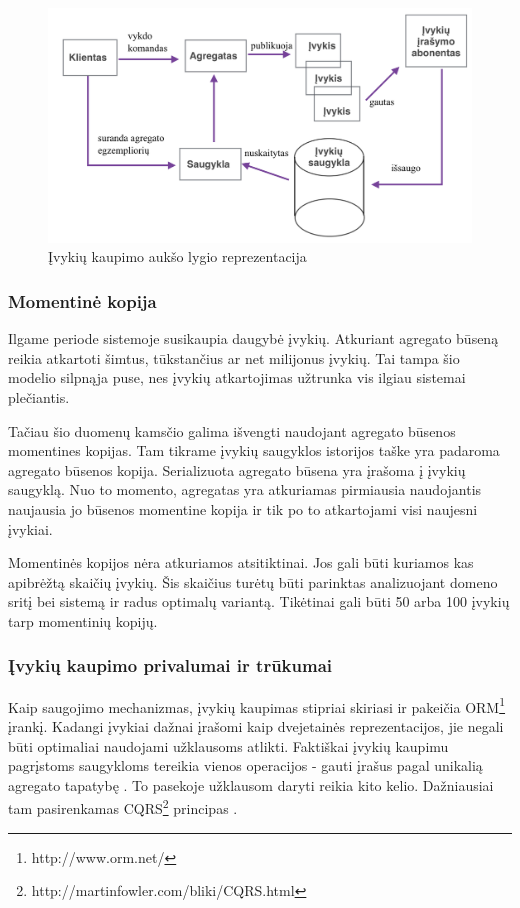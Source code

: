 \begin{figure}[ht]
	\centering
	\includegraphics[width=0.9\linewidth]{pics/es.png}
	\caption{Įvykių kaupimo aukšo lygio reprezentacija}
	\label{pic:es}
\end{figure}

\subsubsection{Momentinė kopija}

Ilgame periode sistemoje susikaupia daugybė įvykių. Atkuriant agregato būseną reikia atkartoti šimtus, tūkstančius ar net milijonus įvykių. Tai tampa šio modelio silpnąja puse, nes įvykių atkartojimas užtrunka vis ilgiau sistemai plečiantis.

Tačiau šio duomenų kamsčio galima išvengti naudojant agregato būsenos momentines kopijas. Tam tikrame įvykių saugyklos istorijos taške yra padaroma agregato būsenos kopija. Serializuota agregato būsena yra įrašoma į įvykių saugyklą. Nuo to momento, agregatas yra atkuriamas pirmiausia naudojantis naujausia jo būsenos momentine kopija ir tik po to atkartojami visi naujesni įvykiai.

Momentinės kopijos nėra atkuriamos atsitiktinai. Jos gali būti kuriamos kas apibrėžtą skaičių įvykių. Šis skaičius turėtų būti parinktas analizuojant domeno sritį bei sistemą ir radus optimalų variantą. Tikėtinai gali būti 50 arba 100 įvykių tarp momentinių kopijų.

\subsubsection{Įvykių kaupimo privalumai ir trūkumai}

Kaip saugojimo mechanizmas, įvykių kaupimas stipriai skiriasi ir pakeičia ORM\footnote{http://www.orm.net/} įrankį. Kadangi įvykiai dažnai įrašomi kaip dvejetainės reprezentacijos, jie negali būti optimaliai naudojami užklausoms atlikti. Faktiškai įvykių kaupimu pagrįstoms saugykloms tereikia vienos operacijos - gauti įrašus pagal unikalią agregato tapatybę \cite{CQRS:GregYoung}. To pasekoje užklausom daryti reikia kito kelio. Dažniausiai tam pasirenkamas CQRS\footnote{http://martinfowler.com/bliki/CQRS.html} principas \cite{Betts:2013:ECE:2509680}. 

